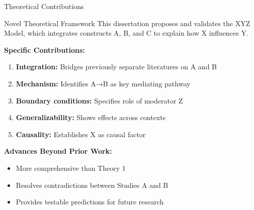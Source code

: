 \documentclass[aspectratio=169,12pt]{beamer}
\begin{document}
\begin{frame}{Theoretical Contributions}
  \begin{exampleblock}{Novel Theoretical Framework}
    This dissertation proposes and validates the XYZ Model, which integrates constructs A, B, and C to explain how X influences Y.
  \end{exampleblock}

  \vspace{0.5cm}

  \textbf{Specific Contributions:}
  \begin{enumerate}
    \item \textbf{Integration:} Bridges previously separate literatures on A and B
    \item \textbf{Mechanism:} Identifies A→B as key mediating pathway
    \item \textbf{Boundary conditions:} Specifies role of moderator Z
    \item \textbf{Generalizability:} Shows effects across contexts
    \item \textbf{Causality:} Establishes X as causal factor
  \end{enumerate}

  \vspace{0.5cm}

  \textbf{Advances Beyond Prior Work:}
  \begin{itemize}
    \item More comprehensive than Theory 1 \cite{theory1}
    \item Resolves contradictions between Studies A and B
    \item Provides testable predictions for future research
  \end{itemize}
\end{frame}
\end{document}
